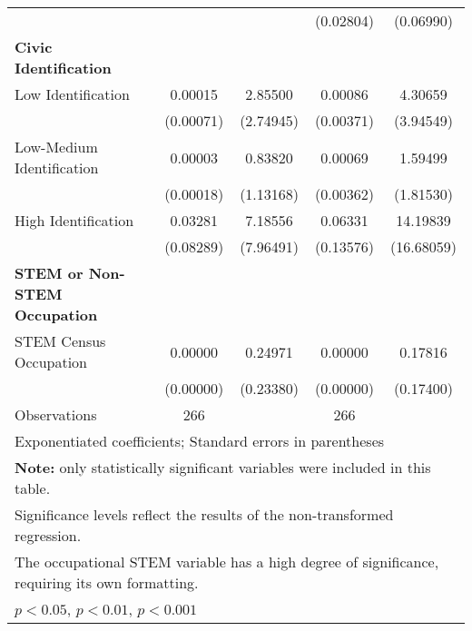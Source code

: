 \begin{table}[htbp]
\begin{tabular}{l*{4}{c}}
                              &                   &                   & (0.02804)         & (0.06990)         \\
\textbf{Civic Identification} &                   &                   &                   &                   \\
\hspace{0.25cm} Low Identification&   0.00015         &   2.85500         &   0.00086         &   4.30659         \\
                              & (0.00071)         & (2.74945)         & (0.00371)         & (3.94549)         \\
\hspace{0.25cm} Low-Medium Identification&   0.00003         &   0.83820         &   0.00069         &   1.59499         \\
                              & (0.00018)         & (1.13168)         & (0.00362)         & (1.81530)         \\
\hspace{0.25cm} High Identification&   0.03281         &   7.18556         &   0.06331         &  14.19839\sym{*}  \\
                              & (0.08289)         & (7.96491)         & (0.13576)         &(16.68059)         \\
\textbf{STEM or Non-STEM Occupation}&                   &                   &                   &                   \\
\hspace{0.25cm} STEM Census Occupation&   0.00000\sym{**} &   0.24971         &   0.00000\sym{**} &   0.17816         \\
                              & (0.00000)         & (0.23380)         & (0.00000)         & (0.17400)         \\
\midrule
Observations                  &       266         &                   &       266         &                   \\
\bottomrule
\multicolumn{5}{l}{\footnotesize Exponentiated coefficients; Standard errors in parentheses}\\
\multicolumn{5}{l}{\footnotesize \textbf{Note:} only statistically significant variables were included in this table.}\\
\multicolumn{5}{l}{\footnotesize Significance levels reflect the results of the non-transformed regression.}\\
\multicolumn{5}{l}{\footnotesize The occupational STEM variable has a high degree of significance, requiring its own formatting.}\\
\multicolumn{5}{l}{\footnotesize \sym{*} \(p<0.05\), \sym{**} \(p<0.01\), \sym{***} \(p<0.001\)}\\
\end{tabular}
\end{table}
